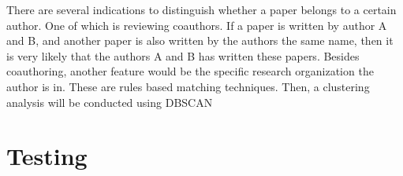 \documentclass{article}
\begin{document}
There are several indications to distinguish whether a paper belongs to a certain author. 
One of which is reviewing coauthors. If a paper is written by author A and B, and another 
paper is also written by the authors the same name, then it is very likely that the authors
 A and B has written these papers. Besides coauthoring, another feature would be the specific 
 research organization the author is in. These are rules based matching techniques. Then, 
 a clustering analysis will be conducted using DBSCAN


\section{Testing}
\end{document}
